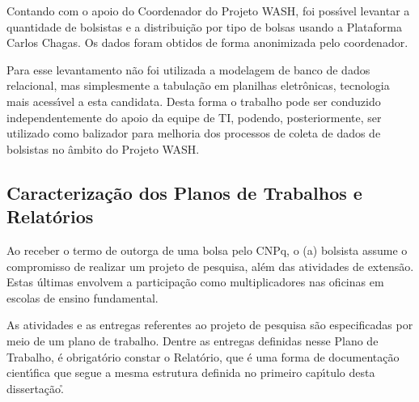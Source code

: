 \documentclass[
12pt,		%
openright,	%
twoside,  %
a4paper,			%
chapter=TITLE,		%
english,			%
french,				%
spanish,			%
brazil				%
]{USPSC-classe/USPSC}
\begin{document}
Contando com o apoio do Coordenador do Projeto WASH, foi poss\'{\i}vel levantar a quantidade de bolsistas e a distribui\c{c}\~ao por tipo de bolsas usando a Plataforma Carlos Chagas. Os dados foram obtidos de forma anonimizada pelo coordenador.














Para esse levantamento n\~ao foi utilizada a modelagem de banco de dados relacional, mas simplesmente a tabula\c{c}\~ao em planilhas eletr\^onicas, tecnologia mais acess\'{\i}vel a esta candidata. Desta forma o trabalho pode ser conduzido independentemente do apoio da equipe de TI, podendo, posteriormente, ser utilizado como balizador para melhoria dos processos de coleta de dados de bolsistas no \^ambito do Projeto WASH.














\subsection[Caracteriza\c{c}\~ao dos Planos de Trabalhos e Relat\'orios]{Caracteriza\c{c}\~ao dos Planos de Trabalhos e Relat\'orios}\label{Caracteriza\c{c}\~ao dos Planos de Trabalhos e Relat\'orios}
Ao receber o termo de outorga de uma bolsa pelo CNPq, o (a) bolsista assume o compromisso de realizar um projeto de pesquisa, al\'em das atividades de extens\~ao. Estas \'ultimas envolvem a participa\c{c}\~ao como multiplicadores nas oficinas em escolas de ensino fundamental.














As atividades e as entregas referentes ao projeto de pesquisa s\~ao especificadas por meio de um plano de trabalho. Dentre as entregas definidas nesse Plano de Trabalho, \'e obrigat\'orio constar o Relat\'orio, que \'e uma forma de documenta\c{c}\~ao cient\'{\i}fica que segue a mesma estrutura definida no primeiro cap\'{\i}tulo desta disserta\c{c}\~ao.\r\n
\end{document}
